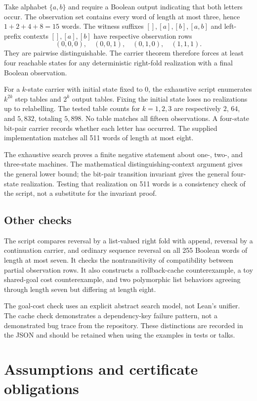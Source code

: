 Take alphabet $\{a,b\}$ and require a Boolean output indicating that both letters occur. The observation set contains every word of length at most three, hence $1+2+4+8=15$ words. The witness suffixes $[],[a],[b],[a,b]$ and left-prefix contexts $[],[a],[b]$ have respective observation rows
\[
 (0,0,0),\quad(0,0,1),\quad(0,1,0),\quad(1,1,1).
\]
They are pairwise distinguishable. The carrier theorem therefore forces at least four reachable states for any deterministic right-fold realization with a final Boolean observation.

For a $k$-state carrier with initial state fixed to 0, the exhaustive script enumerates $k^{2k}$ step tables and $2^k$ output tables. Fixing the initial state loses no realizations up to relabelling. The tested table counts for $k=1,2,3$ are respectively $2$, $64$, and $5{,}832$, totaling $5{,}898$. No table matches all fifteen observations. A four-state bit-pair carrier records whether each letter has occurred. The supplied implementation matches all 511 words of length at most eight.

The exhaustive search proves a finite negative statement about one-, two-, and three-state machines. The mathematical distinguishing-context argument gives the general lower bound; the bit-pair transition invariant gives the general four-state realization. Testing that realization on 511 words is a consistency check of the script, not a substitute for the invariant proof.

\subsection{Other checks}

The script compares reversal by a list-valued right fold with append, reversal by a continuation carrier, and ordinary sequence reversal on all 255 Boolean words of length at most seven. It checks the nontransitivity of compatibility between partial observation rows. It also constructs a rollback-cache counterexample, a toy shared-goal cost counterexample, and two polymorphic list behaviors agreeing through length seven but differing at length eight.

The goal-cost check uses an explicit abstract search model, not Lean's unifier. The cache check demonstrates a dependency-key failure pattern, not a demonstrated bug trace from the repository. These distinctions are recorded in the JSON and should be retained when using the examples in tests or talks.

\clearpage
\section{Assumptions and certificate obligations}\label{app:obligations}

